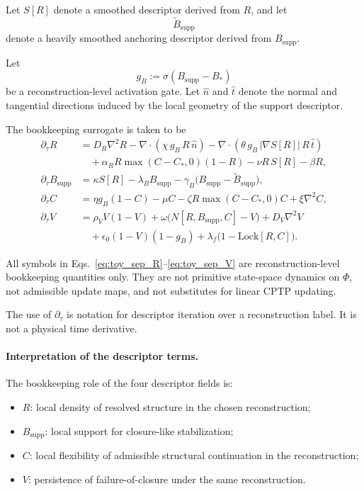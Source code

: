 \documentclass[aps,prx,onecolumn,11pt]{revtex4-2}
\theoremstyle{plain}
\theoremstyle{definition}
\theoremstyle{remark}
\begin{document}
Let \(S[R]\) denote a smoothed descriptor derived from \(R\), and let
\[
\widetilde{B}_{\mathrm{supp}}
\]
denote a heavily smoothed anchoring descriptor derived from
\(B_{\mathrm{supp}}\).

Let
\begin{equation}
g_B
:=
\sigma(B_{\mathrm{supp}}-B_\ast)
\label{eq:toy_sep_gate}
\end{equation}
be a reconstruction-level activation gate. Let \(\hat n\) and \(\hat t\)
denote the normal and tangential directions induced by the local
geometry of the support descriptor.

The bookkeeping surrogate is taken to be
\begin{align}
\partial_\tau R
&=
D_R\nabla^2R
-\nabla\cdot\!\left(\chi\,g_B\,R\,\hat n\right)
-\nabla\cdot\!\left(\theta\,g_B\,|\nabla S[R]|\,R\,\hat t\right)
\nonumber\\
&\quad
+\alpha_R R\max(C-C_\ast,0)(1-R)
-\nu R\,S[R]
-\beta R,
\label{eq:toy_sep_R}
\\[4pt]
\partial_\tau B_{\mathrm{supp}}
&=
\kappa S[R]
-\lambda_B B_{\mathrm{supp}}
-\gamma_B
\bigl(
B_{\mathrm{supp}}
-
\widetilde{B}_{\mathrm{supp}}
\bigr),
\label{eq:toy_sep_B}
\\[4pt]
\partial_\tau C
&=
\eta g_B(1-C)
-\mu C
-\zeta R\max(C-C_\ast,0)C
+\xi\nabla^2C,
\label{eq:toy_sep_C}
\\[4pt]
\partial_\tau V
&=
\rho_V V(1-V)
+\omega
\bigl(
N[R,B_{\mathrm{supp}},C]-V
\bigr)
+D_V\nabla^2V
\nonumber\\
&\quad
+\epsilon_0(1-V)(1-g_B)
+\lambda_f
\bigl(
1-\mathrm{Lock}[R,C]
\bigr).
\label{eq:toy_sep_V}
\end{align}

All symbols in Eqs.~\eqref{eq:toy_sep_R}--\eqref{eq:toy_sep_V} are
reconstruction-level bookkeeping quantities only. They are not
primitive state-space dynamics on \(\Phi\), not admissible update maps,
and not substitutes for linear CPTP updating.

The use of \(\partial_\tau\) is notation for descriptor iteration over
a reconstruction label. It is not a physical time derivative.

\paragraph{Interpretation of the descriptor terms.}

The bookkeeping role of the four descriptor fields is:

\begin{itemize}
\item \(R\): local density of resolved structure in the chosen
reconstruction;
\item \(B_{\mathrm{supp}}\): local support for closure-like
stabilization;
\item \(C\): local flexibility of admissible structural continuation in
the reconstruction;
\item \(V\): persistence of failure-of-closure under the same
reconstruction.
\end{itemize}
\end{document}
